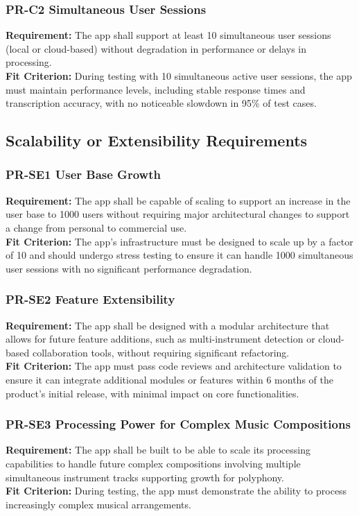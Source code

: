 \documentclass[12pt]{article}
\begin{document}
\subsubsection*{PR-C2 Simultaneous User Sessions}
\textbf{Requirement:} The app shall support at least 10 simultaneous user sessions (local or cloud-based) without degradation in performance or delays in processing.\\
\textbf{Fit Criterion:} During testing with 10 simultaneous active user sessions, the app must maintain performance levels, including stable response times and transcription accuracy, with no noticeable slowdown in 95\% of test cases.

\subsection{Scalability or Extensibility Requirements}
\subsubsection*{PR-SE1 User Base Growth}
\textbf{Requirement:} The app shall be capable of scaling to support an increase in the user base to 1000 users without requiring major architectural changes to support a change from personal to commercial use.\\
\textbf{Fit Criterion:} The app’s infrastructure must be designed to scale up by a factor of 10 and should undergo stress testing to ensure it can handle 1000 simultaneous user sessions with no significant performance degradation.
\subsubsection*{PR-SE2 Feature Extensibility}
\textbf{Requirement:} The app shall be designed with a modular architecture that allows for future feature additions, such as multi-instrument detection or cloud-based collaboration tools, without requiring significant refactoring.\\
\textbf{Fit Criterion:} The app must pass code reviews and architecture validation to ensure it can integrate additional modules or features within 6 months of the product’s initial release, with minimal impact on core functionalities.
\subsubsection*{PR-SE3 Processing Power for Complex Music Compositions}
\textbf{Requirement:} The app shall be built to be able to scale its processing capabilities to handle future complex compositions involving multiple simultaneous instrument tracks supporting growth for polyphony.\\
\textbf{Fit Criterion:} During testing, the app must demonstrate the ability to process increasingly complex musical arrangements.
\end{document}
